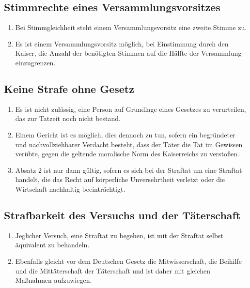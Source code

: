 \documentclass{article}
\begin{document}
\subsection{Stimmrechte eines Versammlungsvorsitzes}
\begin{enumerate}[(1)]
    \item Bei Stimmgleichheit steht einem Versammlungsvorsitz eine zweite Stimme zu.
    \item Es ist einem Versammlungsvorsitz möglich, bei Einstimmung durch den Kaiser, die Anzahl der benötigten Stimmen auf die Hälfte der Versammlung einzugrenzen.
\end{enumerate}

\subsection{Keine Strafe ohne Gesetz}
\begin{enumerate}[(1)]
    \item Es ist nicht zulässig, eine Person auf Grundlage eines Gesetzes zu verurteilen, das zur Tatzeit noch nicht bestand.
    \item Einem Gericht ist es möglich, dies dennoch zu tun, sofern ein begründeter und nachvollziehbarer Verdacht besteht, dass der Täter die Tat im Gewissen verübte, gegen die geltende moralische Norm des Kaiserreichs zu verstoßen.
    \item Absatz 2 ist nur dann gültig, sofern es sich bei der Straftat um eine Straftat handelt, die das Recht auf körperliche Unversehrtheit verletzt oder die Wirtschaft nachhaltig beeinträchtigt.
\end{enumerate}

\subsection{Strafbarkeit des Versuchs und der Täterschaft}
\begin{enumerate}[(1)]
    \item Jeglicher Versuch, eine Straftat zu begehen, ist mit der Straftat selbst äquivalent zu behandeln.
    \item Ebenfalls gleicht vor dem Deutschen Gesetz die Mitwisserschaft, die Beihilfe und die Mittäterschaft der Täterschaft und ist daher mit gleichen Maßnahmen aufzuwiegen.
\end{enumerate}
\end{document}
